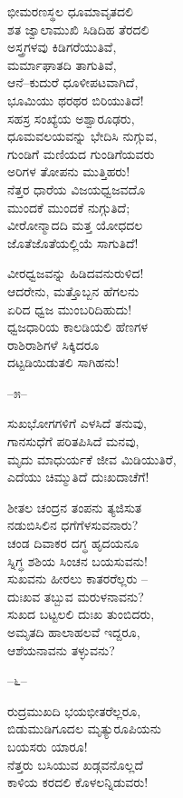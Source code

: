 ಭೀಮರಣಸ್ಥಲ ಧೂಮಾವೃತದಲಿ\\ಶತ ಜ್ವಾಲಾಮುಖಿ ಸಿಡಿದಿಹ ತೆರದಲಿ\\ಅಸ್ತ್ರಗಳವು ಕಿಡಿಗರೆಯುತಿವೆ,\\ಮರ್ಮಾಘಾತದಿ ತಾಗುತಿವೆ,\\ಆನೆ–ಕುದುರೆ ಧೂಳೀಪಟವಾಗಿದೆ,\\ಭೂಮಿಯು ಥರಥರ ಬಿರಿಯುತಿದೆ!\\ಸಹಸ್ರ ಸಂಖ್ಯೆಯ ಅಶ್ವಾರೂಢರು,\\ಧೂಮವಲಯವನ್ನು ಭೇದಿಸಿ ನುಗ್ಗುವ,\\ಗುಂಡಿಗೆ ಮಣಿಯದ ಗುಂಡಿಗೆಯವರು\\ಅರಿಗಳ ತೋಪನು ಮುತ್ತಿಹರು!\\
 ನೆತ್ತರ ಧಾರೆಯ ವಿಜಯಧ್ವಜವದೊ\\ಮುಂದಕೆ ಮುಂದಕೆ ನುಗ್ಗುತಿದೆ;\\ವೀರೋನ್ಮಾದದಿ ಮತ್ತ ಯೋಧದಲ\\ಜೊತೆಜೊತೆಯಲ್ಲಿಯೆ ಸಾಗುತಿದೆ!

ವೀರಧ್ವಜವನ್ನು ಹಿಡಿದವನುರುಳಿದ!\\ಆದರೇನು, ಮತ್ತೊಬ್ಬನ ಹೆಗಲನು\\ಏರಿದ ಧ್ವಜ ಮುಂಬರಿದಿಹುದು!\\ಧ್ವಜಧಾರಿಯ ಕಾಲಡಿಯಲಿ ಹೆಣಗಳ\\ರಾಶಿರಾಶಿಗಳೆ ಸಿಕ್ಕಿದರೂ\\ದಟ್ಟಡಿಯಿಡುತಲಿ ಸಾಗಿಹನು!

\begin{center}
–೫–
\end{center}

ಸುಖಭೋಗಗಳಿಗೆ ಎಳಸಿದೆ ತನುವು,\\ಗಾನಸುಧೆಗೆ ಪರಿತಪಿಸಿದೆ ಮನವು,\\ಮೃದು ಮಾಧುರ್ಯಕೆ ಜೀವ ಮಿಡಿಯುತಿರೆ,\\ಎದೆಯು ಚಿಮ್ಮುತಿದೆ ದುಃಖದಾಚೆಗೆ!

ಶೀತಲ ಚಂದ್ರನ ತಂಪನು ತ್ಯಜಿಸುತ\\ನಡುಬಿಸಿಲಿನ ಧಗೆಗೆಳಸುವನಾರು?\\ಚಂಡ ದಿವಾಕರ ದಗ್ಧ ಹೃದಯನೂ\\ಸ್ನಿಗ್ಧ ಶಶಿಯ ಸಿಂಚನ ಬಯಸುವನು!\\
 ಸುಖವನು ಹೀರಲು ಕಾತರರೆಲ್ಲರು –\\ದುಃಖವ ತಬ್ಬುವ ಮರುಳನಾವನು?\\ಸುಖದ ಬಟ್ಟಲಲಿ ದುಃಖ ತುಂಬಿದರು,\\ಅಮೃತದಿ ಹಾಲಾಹಲವೆ ಇದ್ದರೂ,\\ಆಶೆಯನಾವನು ತಳ್ಳುವನು?

\begin{center}
–೬–
\end{center}

ರುದ್ರಮುಖದಿ ಭಯಭೀತರೆಲ್ಲರೂ,\\ಬಿಡುಮುಡಿಗೂದಲ ಮೃತ್ಯುರೂಪಿಯನು\\ಬಯಸರು ಯಾರೂ!\\ನೆತ್ತರು ಬಸಿಯುವ ಖಡ್ಗವನೊಲ್ಲದೆ\\ಕಾಳಿಯ ಕರದಲಿ ಕೊಳಲನ್ನಿಡುವರು!

